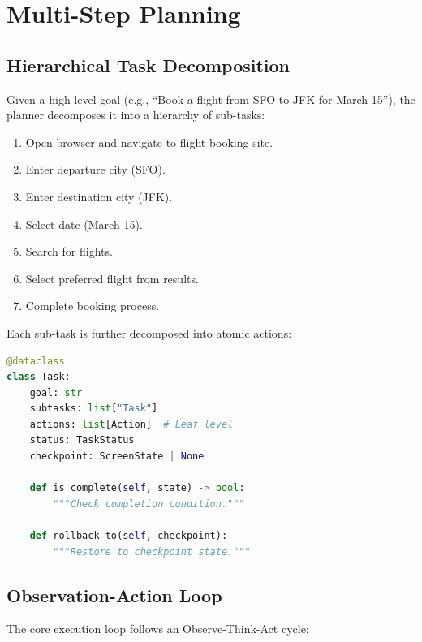 \section{Multi-Step Planning}

\label{sec:planning}

\subsection{Hierarchical Task Decomposition}

Given a high-level goal (e.g., ``Book a flight from SFO to JFK for March 15''), the planner decomposes it into a hierarchy of sub-tasks:

\begin{enumerate}[leftmargin=*]
    \item Open browser and navigate to flight booking site.
    \item Enter departure city (SFO).
    \item Enter destination city (JFK).
    \item Select date (March 15).
    \item Search for flights.
    \item Select preferred flight from results.
    \item Complete booking process.
\end{enumerate}

Each sub-task is further decomposed into atomic actions:

\begin{lstlisting}[language=Python, caption=Task decomposition structure]
@dataclass
class Task:
    goal: str
    subtasks: list["Task"]
    actions: list[Action]  # Leaf level
    status: TaskStatus
    checkpoint: ScreenState | None

    def is_complete(self, state) -> bool:
        """Check completion condition."""

    def rollback_to(self, checkpoint):
        """Restore to checkpoint state."""
\end{lstlisting}

\subsection{Observation-Action Loop}

The core execution loop follows an Observe-Think-Act cycle:

